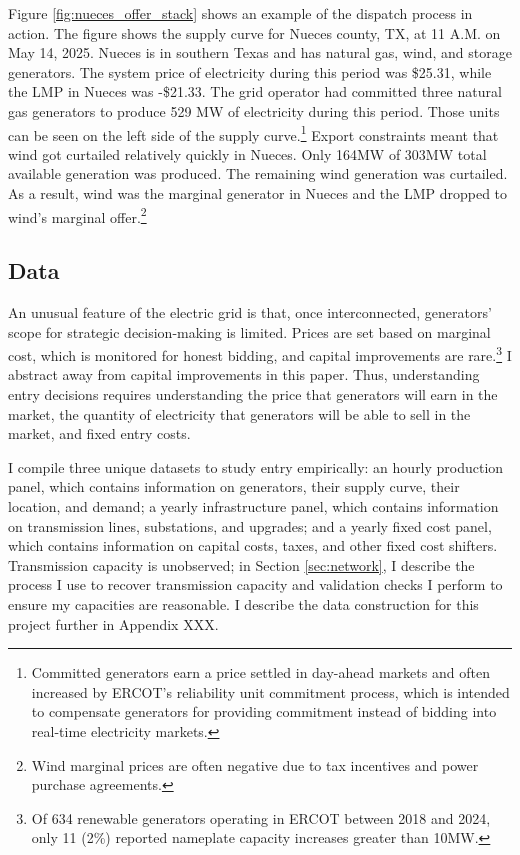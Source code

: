 \documentclass[12pt]{article}
\begin{document}
Figure \ref{fig:nueces_offer_stack} shows an example of the dispatch process in action. The figure shows the supply curve for Nueces county, TX, at 11 A.M. on May 14, 2025. Nueces is in southern Texas and has natural gas, wind, and storage generators. The system price of electricity during this period was \$25.31, while the LMP in Nueces was -\$21.33. The grid operator had committed three natural gas generators to produce 529 MW of electricity during this period. Those units can be seen on the left side of the supply curve.\footnote{Committed generators earn a price settled in day-ahead markets and often increased by ERCOT's reliability unit commitment process, which is intended to compensate generators for providing commitment instead of bidding into real-time electricity markets.} Export constraints meant that wind got curtailed relatively quickly in Nueces. Only 164MW of 303MW total available generation was produced. The remaining wind generation was curtailed. As a result, wind was the marginal generator in Nueces and the LMP dropped to wind's marginal offer.\footnote{Wind marginal prices are often negative due to tax incentives and power purchase agreements.}

\subsection{Data}
\label{sec:data}

An unusual feature of the electric grid is that, once interconnected, generators' scope for strategic decision-making is limited. Prices are set based on marginal cost, which is monitored for honest bidding, and capital improvements are rare.\footnote{Of 634 renewable generators operating in ERCOT between 2018 and 2024, only 11 (2\%) reported nameplate capacity increases greater than 10MW.} I abstract away from capital improvements in this paper. Thus, understanding entry decisions requires understanding the price that generators will earn in the market, the quantity of electricity that generators will be able to sell in the market, and fixed entry costs.

I compile three unique datasets to study entry empirically: an hourly production panel, which contains information on generators, their supply curve, their location, and demand; a yearly infrastructure panel, which contains information on transmission lines, substations, and upgrades; and a yearly fixed cost panel, which contains information on capital costs, taxes, and other fixed cost shifters. Transmission capacity is unobserved; in Section \ref{sec:network}, I describe the process I use to recover transmission capacity and validation checks I perform to ensure my capacities are reasonable. I describe the data construction for this project further in Appendix XXX. 
\end{document}
